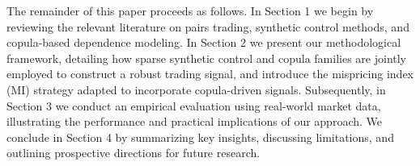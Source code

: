 %
%


The remainder of this paper proceeds as follows. 
%
In Section 1 %
we begin by reviewing the relevant literature on pairs trading, synthetic control methods, and copula-based dependence modeling. 
%
In Section 2 %
we present our methodological framework, detailing how sparse synthetic control and copula families are jointly employed to construct a robust trading signal, and introduce the mispricing index (MI) strategy adapted to incorporate copula-driven signals. 
%
Subsequently, in Section 3 %
we conduct an empirical evaluation using real-world market data, illustrating the performance and practical implications of our approach. 
%
We conclude in Section 4 %
by summarizing key insights, discussing limitations, and outlining prospective directions for future research.

